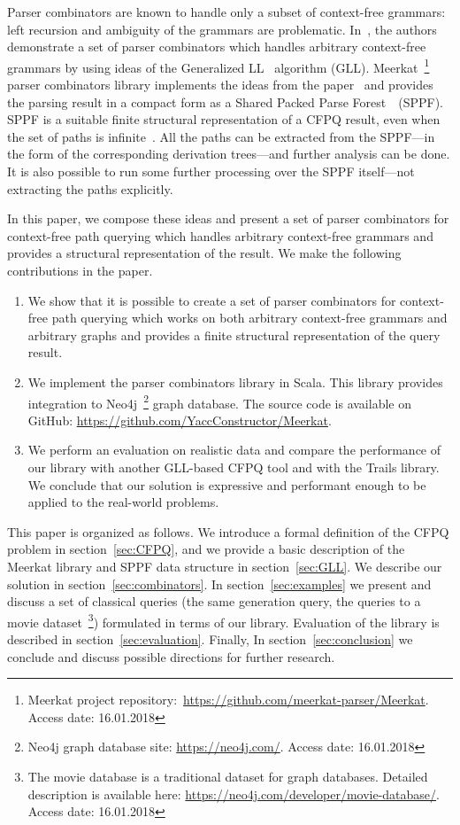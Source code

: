 Parser combinators are known to handle only a subset of context-free grammars: left recursion and ambiguity of the grammars are problematic.
In~\cite{Meerkat}, the authors demonstrate a set of parser combinators which handles arbitrary context-free grammars by using ideas of the Generalized LL~\cite{scott2010gll} algorithm (GLL).
Meerkat~\footnote{Meerkat project repository:~\url{https://github.com/meerkat-parser/Meerkat}. Access date: 16.01.2018} parser combinators library implements the ideas from the paper~\cite{Meerkat} and provides the parsing result in a compact form as a Shared Packed Parse Forest~\cite{SPPF}~(SPPF).
SPPF is a suitable finite structural representation of a CFPQ result, even when the set of paths is infinite~\cite{GrigorevR16}.
All the paths can be extracted from the SPPF---in the form of the corresponding derivation trees---and further analysis can be done.
It is also possible to run some further processing over the SPPF itself---not extracting the paths explicitly.

In this paper, we compose these ideas and present a set of parser combinators for context-free path querying which handles arbitrary context-free grammars and provides a structural representation of the result.
We make the following contributions in the paper.

\begin{enumerate}
\item We show that it is possible to create a set of parser combinators for context-free path querying which works on both arbitrary context-free grammars and arbitrary graphs and provides a finite structural representation of the query result.
\item We implement the parser combinators library in Scala. This library provides integration to Neo4j~\footnote{Neo4j graph database site: \url{https://neo4j.com/}. Access date: 16.01.2018} graph database. The source code is available on GitHub: \url{https://github.com/YaccConstructor/Meerkat}.
\item We perform an evaluation on realistic data and compare the performance of our library with another GLL-based CFPQ tool and with the Trails library.
We conclude that our solution is expressive and performant enough to be applied to the real-world problems.
\end{enumerate}

This paper is organized as follows.
We introduce a formal definition of the CFPQ problem in section~\ref{sec:CFPQ}, and we provide a basic description of the Meerkat library and SPPF data structure in section~\ref{sec:GLL}.
We describe our solution in section~\ref{sec:combinators}.
In section~\ref{sec:examples} we present and discuss a set of classical queries (the same generation query, the queries to a movie dataset~\footnote{The movie database is a traditional dataset for graph databases. Detailed description is available here: \url{https://neo4j.com/developer/movie-database/}. Access date: 16.01.2018})
formulated in terms of our library.
Evaluation of the library is described in section~\ref{sec:evaluation}.
Finally, In section~\ref{sec:conclusion} we conclude and discuss possible directions for further research.
